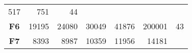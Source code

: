 \documentclass[12pt,a4paper]{article}
\begin{document}
\begin{longtable}[c]{@{}crrrrrr@{}}
\begin{minipage}[t]{0.10\columnwidth}\raggedleft\strut
517
\strut\end{minipage} &
\begin{minipage}[t]{0.11\columnwidth}\raggedleft\strut
751
\strut\end{minipage} &
\begin{minipage}[t]{0.07\columnwidth}\raggedleft\strut
44
\strut\end{minipage}\tabularnewline
\begin{minipage}[t]{0.11\columnwidth}\centering\strut
\textbf{F6}
\strut\end{minipage} &
\begin{minipage}[t]{0.08\columnwidth}\raggedleft\strut
19195
\strut\end{minipage} &
\begin{minipage}[t]{0.08\columnwidth}\raggedleft\strut
24080
\strut\end{minipage} &
\begin{minipage}[t]{0.09\columnwidth}\raggedleft\strut
30049
\strut\end{minipage} &
\begin{minipage}[t]{0.10\columnwidth}\raggedleft\strut
41876
\strut\end{minipage} &
\begin{minipage}[t]{0.11\columnwidth}\raggedleft\strut
200001
\strut\end{minipage} &
\begin{minipage}[t]{0.07\columnwidth}\raggedleft\strut
43
\strut\end{minipage}\tabularnewline
\begin{minipage}[t]{0.11\columnwidth}\centering\strut
\textbf{F7}
\strut\end{minipage} &
\begin{minipage}[t]{0.08\columnwidth}\raggedleft\strut
8393
\strut\end{minipage} &
\begin{minipage}[t]{0.08\columnwidth}\raggedleft\strut
8987
\strut\end{minipage} &
\begin{minipage}[t]{0.09\columnwidth}\raggedleft\strut
10359
\strut\end{minipage} &
\begin{minipage}[t]{0.10\columnwidth}\raggedleft\strut
11956
\strut\end{minipage} &
\begin{minipage}[t]{0.11\columnwidth}\raggedleft\strut
14181
\strut\end{minipage} &

\end{longtable}
\end{document}
